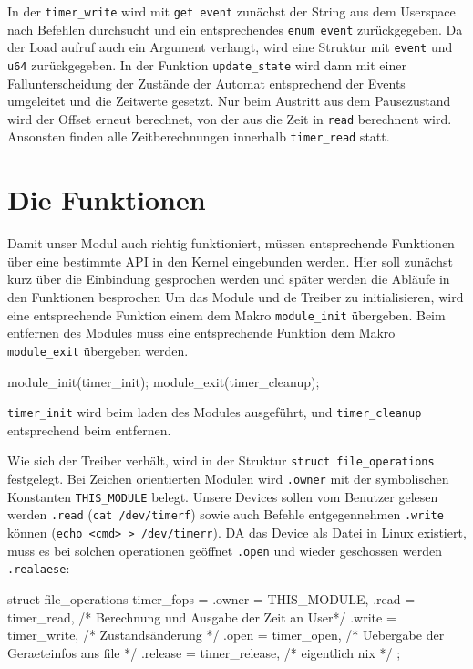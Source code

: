 \documentclass[
   draft=false
  ,paper=a4
  ,twoside=false
  ,fontsize=11pt
  ,headsepline
  ,BCOR10mm
  ,DIV11
  ,parskip=full+
]{scrartcl} %
\begin{document}
In der \texttt{timer\_write} wird mit \texttt{get event} zunächst der String
aus dem Userspace nach Befehlen durchsucht und ein entsprechendes
\texttt{enum event} zurückgegeben. Da der Load aufruf auch ein Argument
verlangt, wird eine Struktur mit \texttt{event} und \texttt{u64} zurückgegeben.
In der Funktion \texttt{update\_state} wird dann mit einer Fallunterscheidung
der Zustände der Automat entsprechend der Events umgeleitet und die
Zeitwerte gesetzt.
Nur beim Austritt aus dem Pausezustand wird der Offset erneut berechnet, von
der aus die Zeit in \texttt{read} berechnent wird. Ansonsten finden
alle Zeitberechnungen innerhalb \texttt{timer\_read} statt.

\section{Die Funktionen}
Damit unser Modul auch richtig funktioniert, müssen entsprechende Funktionen 
über eine bestimmte API in den Kernel eingebunden werden. Hier soll zunächst 
kurz über die Einbindung gesprochen werden und später werden die Abläufe in 
den Funktionen besprochen
Um das Module und de Treiber zu initialisieren, wird eine entsprechende 
Funktion einem dem Makro \texttt{module\_init} übergeben. Beim entfernen des 
Modules muss eine entsprechende Funktion dem Makro \texttt{module\_exit} 
übergeben werden.
\begin{ccode}
    module_init(timer_init);
    module_exit(timer_cleanup);
\end{ccode}
\texttt{timer\_init} wird beim laden des Modules ausgeführt, 
und \texttt{timer\_cleanup} entsprechend beim entfernen.

Wie sich der Treiber verhält, wird in der Struktur 
\texttt{struct file\_operations} festgelegt. Bei Zeichen orientierten Modulen 
wird \texttt{.owner} mit der symbolischen Konstanten \texttt{THIS\_MODULE} 
belegt. Unsere Devices sollen vom Benutzer gelesen werden \texttt{.read} 
(\texttt{cat /dev/timerf}) sowie auch Befehle entgegennehmen \texttt{.write} 
können (\texttt{echo <cmd> > /dev/timerr}). DA das Device als Datei in Linux 
existiert, muss es bei solchen operationen geöffnet \texttt{.open} und wieder
geschossen werden \texttt{.realaese}:
\begin{ccode}
struct file_operations timer_fops = {
    .owner   = THIS_MODULE,
    .read    = timer_read,    /* Berechnung und Ausgabe der Zeit an User*/
    .write   = timer_write,   /* Zustandsänderung */
    .open    = timer_open,    /* Uebergabe der Geraeteinfos ans file */
    .release = timer_release, /* eigentlich nix */
};
\end{ccode}
\end{document}
